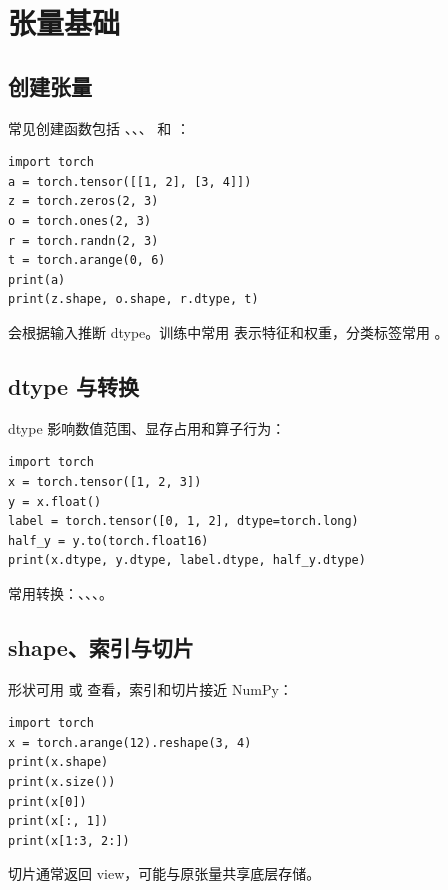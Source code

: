 \section{张量基础}
\subsection{创建张量}
常见创建函数包括 、、、 和 ：
\begin{lstlisting}
import torch
a = torch.tensor([[1, 2], [3, 4]])
z = torch.zeros(2, 3)
o = torch.ones(2, 3)
r = torch.randn(2, 3)
t = torch.arange(0, 6)
print(a)
print(z.shape, o.shape, r.dtype, t)
\end{lstlisting}
 会根据输入推断 dtype。训练中常用  表示特征和权重，分类标签常用 。

\subsection{dtype 与转换}
dtype 影响数值范围、显存占用和算子行为：
\begin{lstlisting}
import torch
x = torch.tensor([1, 2, 3])
y = x.float()
label = torch.tensor([0, 1, 2], dtype=torch.long)
half_y = y.to(torch.float16)
print(x.dtype, y.dtype, label.dtype, half_y.dtype)
\end{lstlisting}
常用转换：、、、。

\subsection{shape、索引与切片}
形状可用  或  查看，索引和切片接近 NumPy：
\begin{lstlisting}
import torch
x = torch.arange(12).reshape(3, 4)
print(x.shape)
print(x.size())
print(x[0])
print(x[:, 1])
print(x[1:3, 2:])
\end{lstlisting}
切片通常返回 view，可能与原张量共享底层存储。

